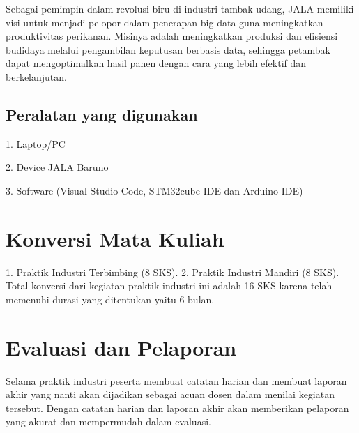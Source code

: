Sebagai pemimpin dalam revolusi biru di industri tambak udang, JALA memiliki visi untuk menjadi pelopor dalam penerapan big data guna meningkatkan produktivitas perikanan. Misinya adalah meningkatkan produksi dan efisiensi budidaya melalui pengambilan keputusan berbasis data, sehingga petambak dapat mengoptimalkan hasil panen dengan cara yang lebih efektif dan berkelanjutan.

\subsection{Peralatan yang digunakan}
1. Laptop/PC

2. Device JALA Baruno

3. Software (Visual Studio Code, STM32cube IDE dan Arduino IDE)



\section{Konversi Mata Kuliah}
1. Praktik Industri Terbimbing (8 SKS).
2. Praktik Industri Mandiri (8 SKS).
Total konversi dari kegiatan praktik industri ini adalah 16 SKS karena telah memenuhi durasi yang ditentukan yaitu 6 bulan.

\section{Evaluasi dan Pelaporan}
Selama praktik industri peserta membuat catatan harian dan membuat laporan akhir yang nanti akan dijadikan sebagai acuan dosen dalam menilai kegiatan tersebut. Dengan catatan harian dan laporan akhir akan memberikan pelaporan yang akurat dan mempermudah dalam evaluasi.